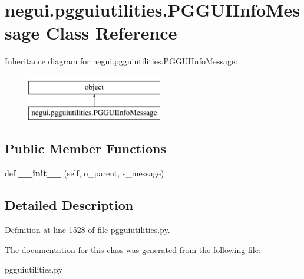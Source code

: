 \hypertarget{classnegui_1_1pgguiutilities_1_1PGGUIInfoMessage}{}\section{negui.\+pgguiutilities.\+P\+G\+G\+U\+I\+Info\+Message Class Reference}
\label{classnegui_1_1pgguiutilities_1_1PGGUIInfoMessage}
Inheritance diagram for negui.\+pgguiutilities.\+P\+G\+G\+U\+I\+Info\+Message\+:\begin{figure}[H]
\begin{center}
\leavevmode
\includegraphics[height=2.000000cm]{classnegui_1_1pgguiutilities_1_1PGGUIInfoMessage}
\end{center}
\end{figure}
\subsection*{Public Member Functions}
\begin{DoxyCompactItemize}
\item 
def {\bfseries \+\_\+\+\_\+init\+\_\+\+\_\+} (self, o\+\_\+parent, s\+\_\+message)\hypertarget{classnegui_1_1pgguiutilities_1_1PGGUIInfoMessage_a6610dd669862924d49f1ec400b4df128}{}\label{classnegui_1_1pgguiutilities_1_1PGGUIInfoMessage_a6610dd669862924d49f1ec400b4df128}

\end{DoxyCompactItemize}


\subsection{Detailed Description}


Definition at line 1528 of file pgguiutilities.\+py.



The documentation for this class was generated from the following file\+:\begin{DoxyCompactItemize}
\item 
pgguiutilities.\+py\end{DoxyCompactItemize}
